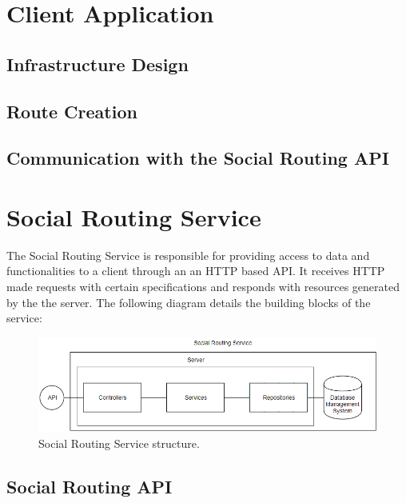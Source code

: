 \documentclass{article}
\begin{document}
    \section{Client Application}
        \subsection*{Infrastructure Design}

        \subsection*{Route Creation}

        \subsection*{Communication with the Social Routing API}

        \newpage

    \section{Social Routing Service}

        The Social Routing Service is responsible for providing access to data and functionalities to a client through an an HTTP \cite{httponlinedocs} based API. It receives HTTP made requests
        with certain specifications and responds with resources generated by the the server. The following diagram details the building blocks of the service:

        \begin{figure}[h]            
            \includegraphics[width=\textwidth]{images/project-structure/service-structure.PNG}
            \caption{Social Routing Service structure.}
        \end{figure}  

        \subsection{Social Routing API}          
           
\end{document}
